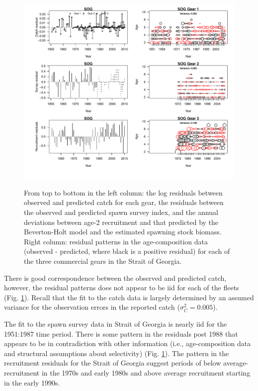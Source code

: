 \begin{figure}[!tbp]
	\includegraphics[width=\textwidth]{../FIGS/iscam_fig_HCAM_SOG_RES.pdf}\\
	\caption{From top to bottom in the left column: the log residuals between observed and predicted catch for each gear, the residuals between the observed and predicted spawn survey index, and the annual deviations between age-2 recruitment and that predicted by the Beverton-Holt model and the estimated spawning stock biomass. Right column: residual patterns in the age-composition data (observed - predicted, where black is a positive residual) for each of the three commercial gears in the Strait of Georgia.}\label{fig_HCAM_SOG_RES}
\end{figure}

There is good correspondence between the observed and predicted catch, however, the residual patterns does not appear to be iid for each of the fleets (Fig. \ref{fig_HCAM_SOG_RES}).  Recall that the fit to the catch data is largely determined by an assumed variance for the observation errors in the reported catch ($\sigma_C^2=0.005$).   

The fit to the spawn survey data in Strait of Georgia is nearly iid for the 1951:1987 time period.  There is some pattern in the residuals post 1988 that appears to be in contradiction with other information (i.e., age-composition data and structural assumptions about selectivity) (Fig. \ref{fig_HCAM_SOG_RES}).  The pattern in the recruitment residuals for the Strait of Georgia suggest periods of below average-recruitment in the 1970s and early 1980s and above average recruitment starting in the early 1990s.


